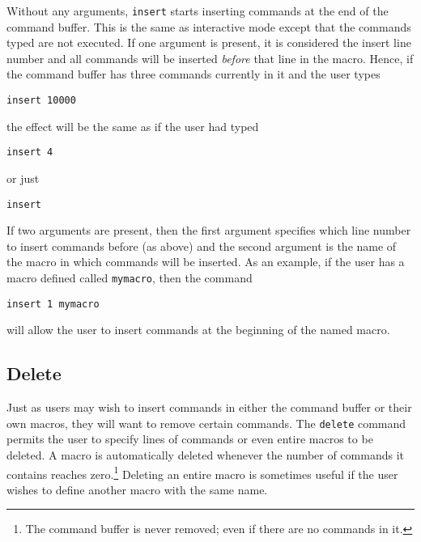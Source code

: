 Without any arguments, {\tt insert} starts inserting commands at the end
of the command buffer.
This is the same as interactive mode except that the commands typed are
not executed.
If one argument is present, it is considered the insert line number and
all commands will be inserted {\em before} that line in the macro.
Hence, if the command buffer has three commands currently in it and the
user types
\begin{wiplist}%
  \item [\wipp] {\tt insert 10000}
\end{wiplist}
the effect will be the same as if the user had typed
\begin{wiplist}%
  \item [\wipp] {\tt insert 4}
\end{wiplist}
or just
\begin{wiplist}%
  \item [\wipp] {\tt insert}
\end{wiplist}
If two arguments are present, then the first argument specifies
which line number to insert commands before (as above) and the second
argument is the name of the macro in which commands will be inserted.
As an example, if the user has a macro defined called {\tt mymacro},
then the command
\begin{wiplist}%
  \item [\wipp] {\tt insert 1 mymacro}
\end{wiplist}
will allow the user to insert commands at the beginning of the named macro.

\subsection*		{Delete}

Just as users may wish to insert commands in either the command buffer
or their own macros,
they will want to remove certain commands.
The {\tt delete} command permits the user to specify lines of commands
or even entire macros to be deleted.
A macro is automatically deleted whenever the number of commands
it contains reaches zero.\footnote{The command buffer is never removed;
even if there are no commands in it.}
Deleting an entire macro is sometimes useful if the user wishes to define
another macro with the same name.

